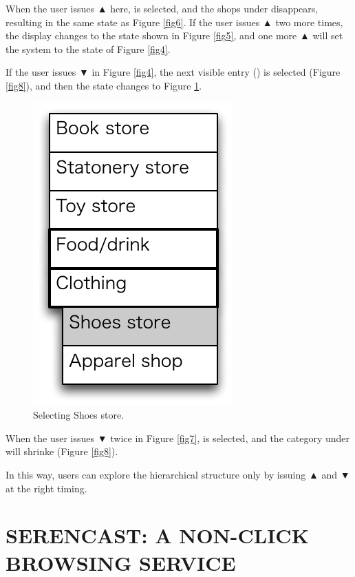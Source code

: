 \documentclass{article}
\def\up{▲}
\def\down{▼}
\begin{document}
When the user issues {\up} here,  is selected,
and the shops under  disappears, 
resulting in the same state as Figure \ref{fig6}.
If the user issues {\up} two more times, the display changes to the state
shown in Figure \ref{fig5},
and one more {\up} will set the system to the state of Figure \ref{fig4}.

If the user issues {\down} in Figure \ref{fig4}, the next visible entry
() is selected (Figure \ref{fig8}), and then the state changes to Figure \ref{fig9}.

\begin{figure}[H]
\centerline{\includegraphics[width=\menuwidth,bb=0 0 139 211]{figures/fig9.pdf}}
\caption{Selecting Shoes store.}
\label{fig9}
\end{figure}

When the user issues {\down} twice in Figure \ref{fig7},
 is selected, and the category under  will shrinke (Figure \ref{fig8}).

In this way, users can explore the hierarchical structure
only by issuing {\up} and {\down} at the right timing.

\section{SERENCAST: A NON-CLICK BROWSING SERVICE}

\end{document}
